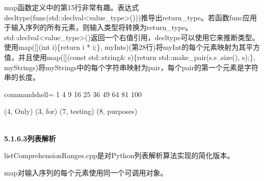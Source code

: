 map函数定义中的第15行非常有趣。表达式decltype(func(std::declval<value\_type>()))推导出return\_type。若函数func应用于输入序列的所有元素，则输入类型将转换为return\_type。std::declval<value\_type>()返回一个右值引用，decltype可以使用它来推断类型。使用map([](int i)\{return i * i;\}, myInts)(第28行)将myInt的每个元素映射为其平方值，并且使用map([](const std::string\& s)\{return std::make\_pair(s.s .size(), s);\}, myStrings)将myStrings中的每个字符串映射为pair，每个pair的第一个元素是字符串的长度。

\begin{tcblisting}{ commandshell={}}
1 4 9 16 25 36 49 64 81 100

(4, Only) (3, for) (7, testing) (8, purposes)
\end{tcblisting}

\hspace*{\fill} \\ %
\noindent
\textbf{5.1.6.3\hspace{0.2cm}列表解析}

listComprehensionRanges.cpp是对Python列表解析算法实现的简化版本。

map对输入序列的每个元素使用同一个可调用对象。

